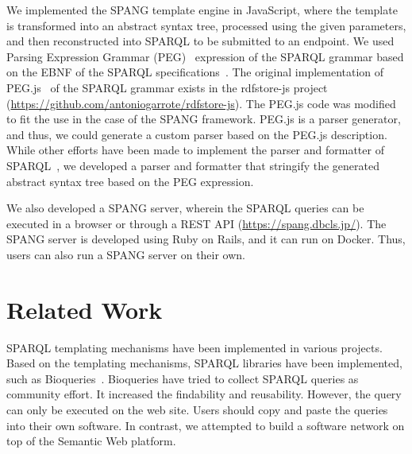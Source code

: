 \documentclass[runningheads]{llncs}
\begin{document}
We implemented the SPANG template engine in JavaScript, where the template is transformed into an abstract syntax tree, processed using the given parameters, and then reconstructed into SPARQL to be submitted to an endpoint. 
We used Parsing Expression Grammar (PEG)~\cite{peg} expression of the SPARQL grammar based on the EBNF of the SPARQL specifications~\cite{sparql}. The original implementation of PEG.js~\cite{pegjs} of the SPARQL grammar exists in the rdfstore-js project (\url{https://github.com/antoniogarrote/rdfstore-js}).
The PEG.js code was modified to fit the use in the case of the SPANG framework.
PEG.js is a parser generator, and thus, we could generate a custom parser based on the PEG.js description. 
While other efforts have been made to implement the parser and formatter of SPARQL~\cite{sparql-js}, we developed a parser and formatter that stringify the generated abstract syntax tree based on the PEG expression. %

We also developed a SPANG server, wherein the SPARQL queries can be executed in a browser or through a REST API (\url{https://spang.dbcls.jp/}).
The SPANG server is developed using Ruby on Rails, and it can run on Docker.
Thus, users can also run a SPANG server on their own. 

\section{Related Work}

SPARQL templating mechanisms have been implemented in various projects. Based on the templating mechanisms, SPARQL libraries have been implemented, such as Bioqueries~\cite{bioqueries}. Bioqueries have tried to collect SPARQL queries as community effort. It increased the findability and reusability.
However, the query can only be executed on the web site.
Users should copy and paste the queries into their own software.
In contrast, we attempted to build a software network on top of the Semantic Web platform.
\end{document}

